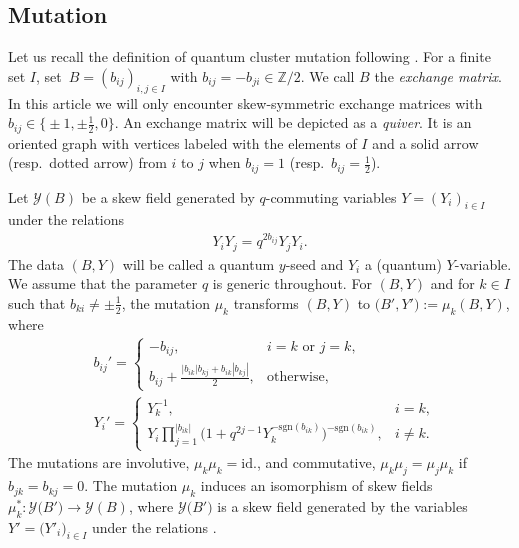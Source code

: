 \documentclass[11pt]{article}
\numberwithin{equation}{section}
\newcommand{\Z}{{\mathbb Z}}
\newcommand\bY{Y}
\numberwithin{equation}{section}
\begin{document}
\subsection{Mutation}\label{ss:mutation}

Let us recall the definition of quantum cluster mutation following \cite{FG06}.
For a finite set $I$, set~${B = (b_{ij})_{i,j \in I}}$ with
$b_{ij} = -b_{ji} \in \Z/2$. We call $B$ the {\it exchange matrix}.
In this article we will only encounter skew-symmetric exchange matrices
with $b_{ij} \in \bigl\{\pm 1, \pm \frac{1}{2},0\bigr\}$. An exchange matrix
will be depicted as a {\em quiver}. It is an oriented graph
with vertices labeled with the elements of $I$ and a solid arrow
(resp.\ dotted arrow) from $i$ to $j$ when $b_{ij}=1$ \big(resp.\
$b_{ij}=\frac{1}{2}$\big).

Let $\mathcal{Y}(B)$ be a skew field generated by $q$-commuting variables
$\bY = (Y_i)_{i \in I}$ under the relations
\begin{align}\label{yyq}
 Y_i Y_j = q^{2b_{ij}} Y_j Y_i.
\end{align}
The data $(B, \bY)$ will be called a quantum $y$-seed and $Y_i$ a (quantum) $Y$-variable.
We assume that the parameter $q$ is generic throughout.
%
For $(B, \bY)$ and for $k \in I$ such that
$b_{ki} \neq \pm \frac{1}{2}$, the mutation $\mu_k$ transforms
$(B, \bY)$ to $\bigl(B', \bY'\bigr) := \mu_k (B,\bY)$, where
\begin{align}\label{muB}
 &b_{ij}' =
 \begin{cases}
 -b_{ij}, & i=k \text{ or } j=k,
 \\
 \displaystyle{b_{ij} + \frac{|b_{ik}| b_{kj} + b_{ik} |b_{kj}|}{2}},
 & \text{otherwise},
 \end{cases}
 \\ \label{muY}
%
 &Y_{i}' =
 \begin{cases}
 Y_k^{-1}, & i=k,
 \\
 \displaystyle{Y_i \prod_{j=1}^{|b_{ik}|}\bigl(1 + q^{2j-1} Y_k^{-\mathrm{sgn}(b_{ik})}\bigr)^{-\mathrm{sgn}(b_{ik})}}, & i \neq k.
 \end{cases}
\end{align}
The mutations are involutive, $\mu_k \mu_k = \mathrm{id.}$, and
commutative, $\mu_k \mu_j = \mu_j \mu_k$ if $b_{jk}=b_{kj}=0$. The
mutation $\mu_k$ induces an isomorphism of skew fields
$\mu_k^{\ast}\colon \mathcal{Y}\bigl(B'\bigr) \to \mathcal{Y}(B)$, where
$\mathcal{Y}\bigl(B'\bigr)$ is a skew field generated by the variables
$Y'=\bigl(Y'_i\bigr)_{i\in I}$ under the relations
.
\end{document}
